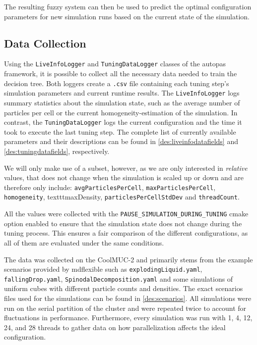 The resulting fuzzy system can then be used to predict the optimal configuration parameters for new simulation runs based on the current state of the simulation.

\subsection{Data Collection}

Using the \texttt{LiveInfoLogger} and \texttt{TuningDataLogger} classes of the \gls{autopas} framework, it is possible to collect all the necessary data needed to train the decision tree. Both loggers create a \texttt{.csv} file containing each tuning step's simulation parameters and current runtime results. The \texttt{LiveInfoLogger} logs summary statistics about the simulation state, such as the average number of particles per cell or the current homogeneity-estimation of the simulation. In contrast, the \texttt{TuningDataLogger} logs the current configuration and the time it took to execute the last tuning step. The complete list of currently available parameters and their descriptions can be found in \autoref{des:liveinfodatafields} and \autoref{des:tuningdatafields}, respectively.

We will only make use of a subset, however, as we are only interested in \emph{relative} values, that does not change when the simulation is scaled up or down and are therefore only include:  \texttt{avgParticlesPerCell}, \texttt{maxParticlesPerCell}, \texttt{homogeneity}, texttt{maxDensity}, \texttt{particlesPerCellStdDev} and \texttt{threadCount}.

All the values were collected with the \texttt{PAUSE\_SIMULATION\_DURING\_TUNING} cmake option enabled to ensure that the simulation state does not change during the tuning process. This ensures a fair comparison of the different configurations, as all of them are evaluated under the same conditions.

The data was collected on the CoolMUC-2  and primarily stems from the example scenarios provided by \gls{mdflexible} such as \texttt{explodingLiquid.yaml}, \texttt{fallingDrop.yaml}, \texttt{SpinodalDecomposition.yaml} and some simulations of uniform cubes with different particle counts and densities. The exact scenarios files used for the simulations can be found in \autoref{des:scenarios}.
All simulations were run on the serial partition of the cluster and were repeated twice to account for fluctuations in performance. Furthermore, every simulation was run with 1, 4, 12, 24, and 28 threads to gather data on how parallelization affects the ideal configuration.


